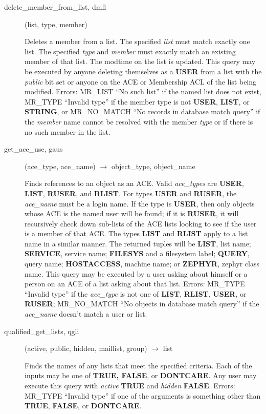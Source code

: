 \documentclass{article}
\begin{document}
\begin{description}
\item[delete\_member\_from\_list, dmfl](list, type, member)

Deletes a member from a list.  The specified {\em list} must match
exactly one list.  The specified {\em type} and {\em member} must
exactly match an existing member of that list.  The modtime on the list
is updated.  This query may be executed by anyone deleting themselves as
a {\bf USER} from a list with the {\em public} bit set or anyone on the
ACE or Membership ACL of the list being modified.  Errors: MR\_LIST ``No
such list'' if the named list does not exist, MR\_TYPE ``Invalid type''
if the member type is not {\bf USER}, {\bf LIST}, or {\bf STRING}, or
MR\_NO\_MATCH ``No records in database match query'' if the {\em member}
name cannot be resolved with the member {\em type} or if there is no
such member in the list.

\item[get\_ace\_use, gaus](ace\_type, ace\_name) $\rightarrow$ object\_type, object\_name

Finds references to an object as an ACE.  Valid {\em ace\_types} are
{\bf USER}, {\bf LIST}, {\bf RUSER}, and {\bf RLIST}.  For types {\bf USER} and
{\bf RUSER}, the {\em ace\_name} must be a login name.  If the type is
{\bf USER}, then only objects whose ACE is the named user will be found;
if it is {\bf RUSER}, it will recursively check down sub-lists of the
ACE lists looking to see if the user is a member of that ACE.  The
types {\bf LIST} and {\bf RLIST} apply to a list name in a similar manner.
The returned tuples will be {\bf LIST}, list name; {\bf SERVICE}, service
name; {\bf FILESYS} and a filesystem label; {\bf QUERY}, query name;
{\bf HOSTACCESS}, machine name; or {\bf ZEPHYR}, zephyr class name.  This
query may be executed by a user asking about himself or a person on an
ACE of a list asking about that list.  Errors: MR\_TYPE ``Invalid type''
if the {\em ace\_type} is not one of {\bf LIST}, {\bf RLIST}, {\bf USER}, or
{\bf RUSER}; MR\_NO\_MATCH ``No objects in database match query'' if the
{\em ace\_name} doesn't match a user or list.

\item[qualified\_get\_lists, qgli](active, public, hidden, maillist,
group) $\rightarrow$ list

Finds the names of any lists that meet the specified criteria.  Each
of the inputs may be one of {\bf TRUE, FALSE}, or {\bf DONTCARE}.  Any
user may execute this query with {\em active} {\bf TRUE} and {\em hidden}
{\bf FALSE}.  Errors: MR\_TYPE ``Invalid type'' if one of the arguments is
something other than {\bf TRUE}, {\bf FALSE}, or {\bf DONTCARE}.


\end{description}
\end{document}
